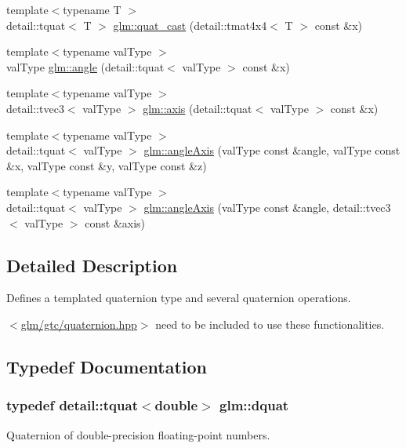 \begin{DoxyCompactItemize}
{\footnotesize template$<$typename T $>$ }\\detail\+::tquat$<$ T $>$ \hyperlink{group__gtc__quaternion_ga24adafe33b0bcad906c8724a762e5299}{glm\+::quat\+\_\+cast} (detail\+::tmat4x4$<$ T $>$ const \&x)
\item 
{\footnotesize template$<$typename val\+Type $>$ }\\val\+Type \hyperlink{group__gtc__quaternion_ga69041d18bd8539fe82d6170932d28362}{glm\+::angle} (detail\+::tquat$<$ val\+Type $>$ const \&x)
\item 
{\footnotesize template$<$typename val\+Type $>$ }\\detail\+::tvec3$<$ val\+Type $>$ \hyperlink{group__gtc__quaternion_ga72457604550d0414e522dbec0d98f276}{glm\+::axis} (detail\+::tquat$<$ val\+Type $>$ const \&x)
\item 
{\footnotesize template$<$typename val\+Type $>$ }\\detail\+::tquat$<$ val\+Type $>$ \hyperlink{group__gtc__quaternion_gaafc03953867e42a39dc08575ad4532ad}{glm\+::angle\+Axis} (val\+Type const \&angle, val\+Type const \&x, val\+Type const \&y, val\+Type const \&z)
\item 
{\footnotesize template$<$typename val\+Type $>$ }\\detail\+::tquat$<$ val\+Type $>$ \hyperlink{group__gtc__quaternion_ga30071b5b9773087b7212a5ce67d0d90a}{glm\+::angle\+Axis} (val\+Type const \&angle, detail\+::tvec3$<$ val\+Type $>$ const \&axis)
\end{DoxyCompactItemize}


\subsection{Detailed Description}
Defines a templated quaternion type and several quaternion operations. 

$<$\hyperlink{gtc_2quaternion_8hpp}{glm/gtc/quaternion.\+hpp}$>$ need to be included to use these functionalities. 

\subsection{Typedef Documentation}
\hypertarget{group__gtc__quaternion_ga80d5f590dba4e894218e1263233b02bb}{}
\subsubsection[{dquat}]{\setlength{\rightskip}{0pt plus 5cm}typedef detail\+::tquat$<$double$>$ {\bf glm\+::dquat}}\label{group__gtc__quaternion_ga80d5f590dba4e894218e1263233b02bb}
Quaternion of double-\/precision floating-\/point numbers.

